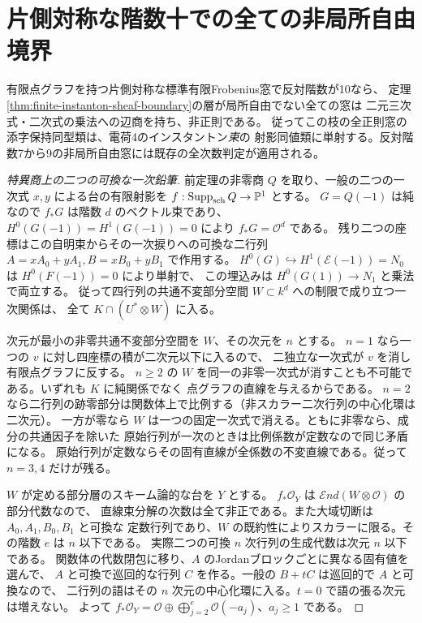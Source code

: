 \section{片側対称な階数十での全ての非局所自由境界}
\label{sec:finite-rank-ten-instanton-boundary}
\begin{theorem}\label{thm:finite-rank-ten-instanton-boundary}
有限点グラフを持つ片側対称な標準有限Frobenius窓で反対階数が10なら、
定理\ref{thm:finite-instanton-sheaf-boundary}の層が局所自由でない全ての窓は
二元三次式・二次式の乗法への辺商を持ち、非正則である。
従ってこの枝の全正則窓の添字保持同型類は、電荷4のインスタントン\emph{束}の
射影同値類に単射する。反対階数7から9の非局所自由窓には既存の全次数判定が適用される。
\end{theorem}
\begin{proof}[特異商上の二つの可換な一次鉛筆]
前定理の非零商 $Q$ を取り、一般の二つの一次式 $x,y$ による台の有限射影を
$f:\operatorname{Supp}_{\rm sch}Q\to\mathbb P^1$ とする。
$G=Q(-1)$ は純なので $f_*G$ は階数 $d$ のベクトル束であり、
$H^0(G(-1))=H^1(G(-1))=0$ により $f_*G=\mathcal O^d$ である。
残り二つの座標はこの自明束からその一次捩りへの可換な二行列
$A=xA_0+yA_1,B=xB_0+yB_1$ で作用する。
$H^0(G)\hookrightarrow H^1(\mathcal E(-1))=N_0$ は $H^0(F(-1))=0$ により単射で、
この埋込みは $H^0(G(1))\to N_1$ と乗法で両立する。
従って四行列の共通不変部分空間 $W\subset k^d$ への制限で成り立つ一次関係は、
全て $K\cap(U^*\otimes W)$ に入る。

次元が最小の非零共通不変部分空間を $W$、その次元を $n$ とする。
$n=1$ なら一つの $v$ に対し四座標の積が二次元以下に入るので、
二独立な一次式が $v$ を消し有限点グラフに反する。
$n\ge2$ の $W$ を同一の非零一次式が消すことも不可能である。いずれも $K$ に純関係でなく
点グラフの直線を与えるからである。
$n=2$ なら二行列の跡零部分は関数体上で比例する（非スカラー二次行列の中心化環は二次元）。
一方が零なら $W$ は一つの固定一次式で消える。ともに非零なら、成分の共通因子を除いた
原始行列が一次のときは比例係数が定数なので同じ矛盾になる。
原始行列が定数ならその固有直線が全係数の不変直線である。従って $n=3,4$ だけが残る。

$W$ が定める部分層のスキーム論的な台を $Y$ とする。
$f_*\mathcal O_Y$ は $\mathcal End(W\otimes\mathcal O)$ の部分代数なので、
直線束分解の次数は全て非正である。また大域切断は $A_0,A_1,B_0,B_1$ と可換な
定数行列であり、$W$ の既約性によりスカラーに限る。その階数 $e$ は $n$ 以下である。
実際二つの可換 $n$ 次行列の生成代数は次元 $n$ 以下である。
関数体の代数閉包に移り、$A$ のJordanブロックごとに異なる固有値を選んで、
$A$ と可換で巡回的な行列 $C$ を作る。一般の $B+tC$ は巡回的で $A$ と可換なので、
二行列の語はその $n$ 次元の中心化環に入る。$t=0$ で語の張る次元は増えない。
よって $f_*\mathcal O_Y=\mathcal O\oplus\bigoplus_{j=2}^e\mathcal O(-a_j)$、$a_j\ge1$ である。
\end{proof}

